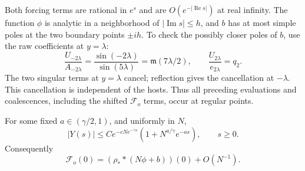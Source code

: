 Both forcing terms are rational in \(e^s\) and are \(O(e^{-|\operatorname{Re}s|})\) at real infinity. The function \(\phi\) is analytic in a neighborhood of \(|\operatorname{Im}s|\le h\), and \(b\) has at most simple poles at the two boundary points \(\pm ih\). To check the possibly closer poles of \(b\), use the raw coefficients at \(y=\lambda\):
\[
 \frac{U_{-2\lambda}}{A_{-2\lambda}}
    =\frac{\sin(-2\lambda)}{\sin(5\lambda)}
    =\mathfrak m(7\lambda/2),\qquad
 \frac{U_{2\lambda}}{e_{2\lambda}}=q_2.
\]
The two singular terms at \(y=\lambda\) cancel; reflection gives the cancellation at \(-\lambda\). This cancellation is independent of the hosts. Thus all preceding evaluations and coalescences, including the shifted \(\mathcal F_o\) terms, occur at regular points.

\begin{lemma}
\label{lem:05-open-interpolation}
For some fixed \(a\in(\gamma/2,1)\), and uniformly in \(N\),
\begin{equation}
 |Y(s)|\le C e^{-cNe^{-\gamma s}}
               (1+N^{a/\gamma}e^{-as}),\qquad s\ge0.
 \label{eq:05-open-error}
\end{equation}
Consequently
\begin{equation}
 \mathcal F_o(0)=(\rho_* *(N\phi+b))(0)+O(N^{-1}).
 \label{eq:05-open-center}
\end{equation}
\end{lemma}

